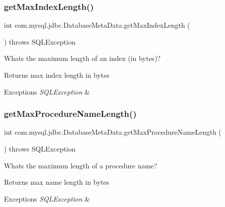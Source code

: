 \subsubsection{\texorpdfstring{get\+Max\+Index\+Length()}{getMaxIndexLength()}}
{\footnotesize\ttfamily int com.\+mysql.\+jdbc.\+Database\+Meta\+Data.\+get\+Max\+Index\+Length (\begin{DoxyParamCaption}{ }\end{DoxyParamCaption}) throws S\+Q\+L\+Exception}

What\textquotesingle{}s the maximum length of an index (in bytes)?

\begin{DoxyReturn}{Returns}
max index length in bytes 
\end{DoxyReturn}

\begin{DoxyExceptions}{Exceptions}
{\em S\+Q\+L\+Exception} & \\
\hline
\end{DoxyExceptions}
\mbox{\label{classcom_1_1mysql_1_1jdbc_1_1_database_meta_data_a9513ea42bbfbc6f21532fef0c3b4b1be}} 
\subsubsection{\texorpdfstring{get\+Max\+Procedure\+Name\+Length()}{getMaxProcedureNameLength()}}
{\footnotesize\ttfamily int com.\+mysql.\+jdbc.\+Database\+Meta\+Data.\+get\+Max\+Procedure\+Name\+Length (\begin{DoxyParamCaption}{ }\end{DoxyParamCaption}) throws S\+Q\+L\+Exception}

What\textquotesingle{}s the maximum length of a procedure name?

\begin{DoxyReturn}{Returns}
max name length in bytes 
\end{DoxyReturn}

\begin{DoxyExceptions}{Exceptions}
{\em S\+Q\+L\+Exception} & \\
\hline
\end{DoxyExceptions}
\mbox{\label{classcom_1_1mysql_1_1jdbc_1_1_database_meta_data_a60b474627e1d42d10c887873fce235ef}} 
